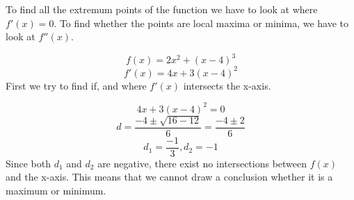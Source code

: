 To find all the extremum points of the function we have to look at where $f'(x) = 0$. To find whether the points are local maxima or minima, we have to look at $f''(x)$.

$$f(x) = 2x^2+(x-4)^3$$
$$f'(x) = 4x+3(x-4)^2$$
First we try to find if, and where $f'(x)$ intersects the x-axis.

$$4x+3(x-4)^2 = 0$$
$$d = \frac{-4 \pm \sqrt{16-12}}{6} = \frac{-4 \pm 2}{6}$$
$$d_1 = \frac{-1}{3}, d_2= -1$$
Since both $d_1$ and $d_2$ are negative, there exist no intersections between $f(x)$ and the x-axis. This means that we cannot draw a conclusion whether it is a maximum or minimum.